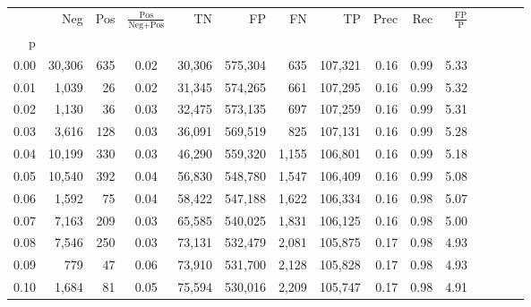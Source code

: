 \begin{tabular}{rrrcrrrrrrrrrrr}
\toprule
{} &     Neg &    Pos & $\frac{\text{Pos}}{\text{Neg}+\text{Pos}}$ &       TN &       FP &       FN &       TP &  Prec &   Rec & $\frac{\text{FP}}{\text{P}}$ \\
p    &         &        &                                            &          &          &          &          &       &       &                              \\
\midrule
0.00 &  30,306 &    635 &                                       0.02 &   30,306 &  575,304 &      635 &  107,321 &  0.16 &  0.99 &                         5.33 \\
0.01 &   1,039 &     26 &                                       0.02 &   31,345 &  574,265 &      661 &  107,295 &  0.16 &  0.99 &                         5.32 \\
0.02 &   1,130 &     36 &                                       0.03 &   32,475 &  573,135 &      697 &  107,259 &  0.16 &  0.99 &                         5.31 \\
0.03 &   3,616 &    128 &                                       0.03 &   36,091 &  569,519 &      825 &  107,131 &  0.16 &  0.99 &                         5.28 \\
0.04 &  10,199 &    330 &                                       0.03 &   46,290 &  559,320 &    1,155 &  106,801 &  0.16 &  0.99 &                         5.18 \\
0.05 &  10,540 &    392 &                                       0.04 &   56,830 &  548,780 &    1,547 &  106,409 &  0.16 &  0.99 &                         5.08 \\
0.06 &   1,592 &     75 &                                       0.04 &   58,422 &  547,188 &    1,622 &  106,334 &  0.16 &  0.98 &                         5.07 \\
0.07 &   7,163 &    209 &                                       0.03 &   65,585 &  540,025 &    1,831 &  106,125 &  0.16 &  0.98 &                         5.00 \\
0.08 &   7,546 &    250 &                                       0.03 &   73,131 &  532,479 &    2,081 &  105,875 &  0.17 &  0.98 &                         4.93 \\
0.09 &     779 &     47 &                                       0.06 &   73,910 &  531,700 &    2,128 &  105,828 &  0.17 &  0.98 &                         4.93 \\
0.10 &   1,684 &     81 &                                       0.05 &   75,594 &  530,016 &    2,209 &  105,747 &  0.17 &  0.98 &                         4.91 \\

\end{tabular}
